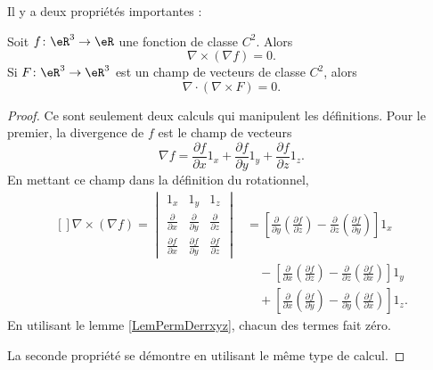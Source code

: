 Il y a deux propriétés importantes :
\begin{theorem}
    Soit $f\colon \eR^3\to \eR$ une fonction de classe $C^2$. Alors
    \begin{equation}
        \nabla\times(\nabla f)=0.
    \end{equation}
    Si $F\colon \eR^3\to \eR^3$ est un champ de vecteurs de classe $C^2$, alors
    \begin{equation}
        \nabla\cdot(\nabla\times F)=0.
    \end{equation}
\end{theorem}

\begin{proof}
    Ce sont seulement deux calculs qui manipulent les définitions. Pour le premier, la divergence de $f$ est le champ de vecteurs
    \begin{equation}
        \nabla f=\frac{ \partial f }{ \partial x }1_x+\frac{ \partial f }{ \partial y }1_y+\frac{ \partial f }{ \partial z }1_z.
    \end{equation}
    En mettant ce champ dans la définition du rotationnel,
    \begin{equation}
        \begin{aligned}[]
            \nabla\times(\nabla f)=\begin{vmatrix}
                 1_x   &   1_y    &   1_z    \\
                 \frac{ \partial  }{ \partial x }    &   \frac{ \partial  }{ \partial y }    &   \frac{ \partial  }{ \partial z }    \\
                 \frac{ \partial f }{ \partial x }    &   \frac{ \partial f }{ \partial y }    &   \frac{ \partial f }{ \partial z }
            \end{vmatrix}
            &=\left[ \frac{ \partial  }{ \partial y }\left( \frac{ \partial f }{ \partial z } \right)-\frac{ \partial  }{ \partial z }\left( \frac{ \partial f }{ \partial y } \right) \right]1_x\\
            &\quad-\left[ \frac{ \partial  }{ \partial x }\left( \frac{ \partial f }{ \partial z } \right)-\frac{ \partial  }{ \partial z }\left( \frac{ \partial f }{ \partial x } \right) \right]1_y\\
            &\quad+\left[ \frac{ \partial  }{ \partial x }\left( \frac{ \partial f }{ \partial y } \right)-\frac{ \partial  }{ \partial y }\left( \frac{ \partial f }{ \partial x } \right) \right]1_z.
        \end{aligned}
    \end{equation}
    En utilisant le lemme \ref{LemPermDerrxyz}, chacun des termes fait zéro.

    La seconde propriété se démontre en utilisant le même type de calcul.
\end{proof}

